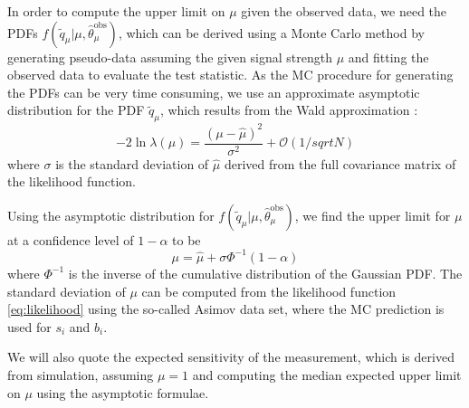 In order to compute the upper limit on $\mu$ given the observed data, we need the PDFs $f(\tilde{q}_\mu | \mu, \hat{\theta}_\mu^{\mathrm{obs}})$, which can be derived using a Monte Carlo method by generating pseudo-data assuming the given signal strength $\mu$ and fitting the observed data to evaluate the test statistic. As the MC procedure for generating the PDFs can be very time consuming, we use an approximate asymptotic distribution \cite{Cowan:2010js} for the PDF $\tilde{q}_\mu$, which results from the Wald approximation \cite{wald1943tests}:
\begin{equation}
-2 \ln{\lambda(\mu)} = \frac{(\mu - \hat{\mu})^2}{\sigma^2}+ \mathcal{O}(1/sqrt{N})
\end{equation}
 where $\sigma$ is the standard deviation of $\hat{\mu}$ derived from the full covariance matrix of the likelihood function.
 
Using the asymptotic distribution for $f(\tilde{q}_\mu | \mu, \hat{\theta}_\mu^{\mathrm{obs}})$, we find the upper limit for $\mu$ at a confidence level of $1 - \alpha$ to be
\begin{equation}
\mu = \hat{\mu} + \sigma \Phi^{-1}(1 - \alpha)
\end{equation}
where $\Phi^{-1}$ is the inverse of the cumulative distribution of the Gaussian PDF. The standard deviation of $\mu$ can be computed from the likelihood function \cref{eq:likelihood} using the so-called Asimov data set, where the MC prediction is used for $s_i$ and $b_i$.

We will also quote the expected sensitivity of the measurement, which is derived from simulation, assuming $\mu = 1$ and computing the median expected upper limit on $\mu$ using the asymptotic formulae. 
